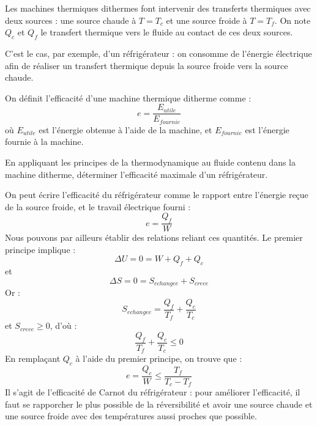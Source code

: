 \documentclass[11pt,fleqn]{book} %
\begin{document}
Les machines thermiques dithermes font intervenir des transferts thermiques avec deux sources : une source chaude à $T = T_c$ et une source froide à $T = T_f$. On note $Q_c$ et $Q_f$ le transfert thermique vers le fluide au contact de ces deux sources.

C'est le cas, par exemple, d'un réfrigérateur : on consomme de l'énergie électrique afin de réaliser un transfert thermique depuis la source froide vers la source chaude.

\begin{definition}
    On définit l'efficacité d'une machine thermique ditherme comme : 
    \begin{equation}
        e = \frac{E_{utile}}{E_{fournie}}
    \end{equation}
    où $E_{utile}$ est l'énergie obtenue à l'aide de la machine, et $E_{fournie}$ est l'énergie fournie à la machine.
\end{definition}

\begin{capex}
En appliquant les principes de la thermodynamique au fluide contenu dans la machine ditherme, déterminer l'efficacité maximale d'un réfrigérateur.
\end{capex}

\begin{solution}
On peut écrire l'efficacité du réfrigérateur comme le rapport entre l'énergie reçue de la source froide, et le travail électrique fourni :
\begin{equation}
    e = \frac{Q_f}{W}
\end{equation}
Nous pouvons par ailleurs établir des relations reliant ces quantités. Le premier principe implique :
\begin{equation}
    \Delta U = 0 = W + Q_f + Q_c
\end{equation}
et
\begin{equation}
    \Delta S = 0 = S_{echangee} + S_{creee}
\end{equation}
Or :
\begin{equation}
    S_{echangee} = \frac{Q_f}{T_f} + \frac{Q_c}{T_c}
\end{equation}
et $S_{creee} \ge 0$, d'où :
\begin{equation}
    \frac{Q_f}{T_f} + \frac{Q_c}{T_c} \le 0
\end{equation}
En remplaçant $Q_c$ à l'aide du premier principe, on trouve que :
\begin{equation}
    e = \frac{Q_c}{W} \le \frac{T_f}{T_c-T_f}
\end{equation}
Il s'agit de l'efficacité de Carnot du réfrigérateur : pour améliorer l'efficacité, il faut se rapporcher le plus possible de la réversibilité et avoir une source chaude et une source froide avec des températures aussi proches que possible.
\end{solution}
\end{document}

